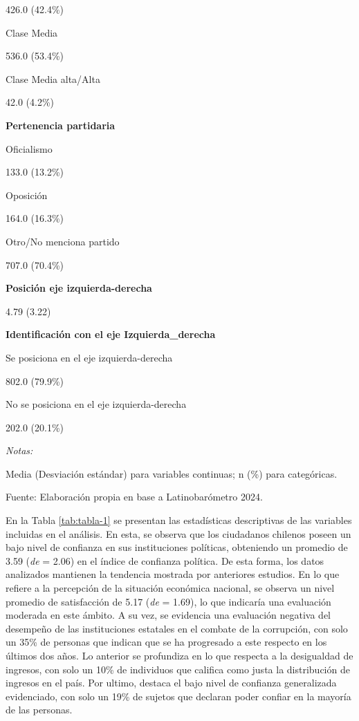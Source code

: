 \documentclass[12pt,twoside]{templates/facsothesis}
\begin{document}
426.0 (42.4\%)

Clase Media

536.0 (53.4\%)

Clase Media alta/Alta

42.0 (4.2\%)

\textbf{Pertenencia partidaria}

Oficialismo

133.0 (13.2\%)

Oposición

164.0 (16.3\%)

Otro/No menciona partido

707.0 (70.4\%)

\textbf{Posición eje izquierda-derecha}

4.79 (3.22)

\textbf{Identificación con el eje Izquierda\_derecha}

Se posiciona en el eje izquierda-derecha

802.0 (79.9\%)

No se posiciona en el eje izquierda-derecha

202.0 (20.1\%)

{\emph{Notas:}}

Media (Desviación estándar) para variables continuas; n (\%) para categóricas.

Fuente: Elaboración propia en base a Latinobarómetro 2024.

En la Tabla \ref{tab:tabla-1} se presentan las estadísticas descriptivas de las variables incluidas en el análisis. En esta, se observa que los ciudadanos chilenos poseen un bajo nivel de confianza en sus instituciones políticas, obteniendo un promedio de 3.59 (\emph{de} = 2.06) en el índice de confianza política. De esta forma, los datos analizados mantienen la tendencia mostrada por anteriores estudios. En lo que refiere a la percepción de la situación económica nacional, se observa un nivel promedio de satisfacción de 5.17 (\emph{de} = 1.69), lo que indicaría una evaluación moderada en este ámbito. A su vez, se evidencia una evaluación negativa del desempeño de las instituciones estatales en el combate de la corrupción, con solo un 35\% de personas que indican que se ha progresado a este respecto en los últimos dos años. Lo anterior se profundiza en lo que respecta a la desigualdad de ingresos, con solo un 10\% de individuos que califica como justa la distribución de ingresos en el país. Por ultimo, destaca el bajo nivel de confianza generalizada evidenciado, con solo un 19\% de sujetos que declaran poder confiar en la mayoría de las personas.
\end{document}
